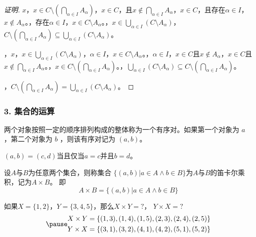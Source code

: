 \documentclass{beamer}
\begin{document}
\begin{CJK*}{UTF8}{gbsn}
\begin{frame}
\begin{proof}[证明]
$x$，$x \in C\setminus (\bigcap_{\alpha \in I}A_{\alpha})$，$x\in C$，且$x \notin \bigcap_{\alpha \in I}A_{\alpha}$，$x\in C$，且存在$\alpha \in I$，$x\notin A_{\alpha}$。，存在$\alpha \in I$，$x\in C\setminus A_{\alpha}$。，$x \in \bigcup_{\alpha \in I}( C\setminus A_{\alpha})$，$C\setminus (\bigcap_{\alpha \in I}A_{\alpha})\subseteq \bigcup_{\alpha\in I}(C\setminus A_{\alpha})$。

，$x$，$x\in \bigcup_{\alpha\in I}(C\setminus A_{\alpha})$，$\alpha \in I$，$x\in C\setminus A_{\alpha}$。，$\alpha \in I$，$x\in C$且$x\notin A_{\alpha}$，$x\in C$且$x\notin \bigcap_{\alpha \in I}A_{\alpha}$。，$x \in C\setminus (\bigcap_{\alpha \in I}A_{\alpha})$。，$\bigcup_{\alpha\in I}(C\setminus A_{\alpha})\subseteq C\setminus (\bigcap_{\alpha \in I}A_{\alpha})$。

，\pause$C\setminus (\bigcap_{\alpha \in I}A_{\alpha})=\bigcup_{\alpha\in I}(C\setminus A_{\alpha})$。
 \end{proof}
\end{frame}
\begin{frame}
  \frametitle{3. 集合的运算}
  \begin{Def}
    两个对象按照一定的顺序排列构成的整体称为一个\alert{有序对}。如果第一个对象为 $a$ ，第二个对象为 $b$ ，则该有序对记为 $(a,b)$。

    $(a,b)=(c,d)$当且仅当$a=c$并且$b=d$。
  \end{Def}\pause
  \begin{Def}
    设$A$与$B$为任意两个集合，则称集合 $\{(a,b)|a\in A \land b \in B\}$为$A$与$B$的\alert{笛卡尔乘积}，记为$A \times B$。
即
\begin{equation*}
  A \times B = \{(a,b)|a \in A \land b \in B\}
\end{equation*}
  \end{Def}\pause
\vspace{-0.5cm}
  \begin{Ex}
    如果$X=\{1,2\}$，$Y=\{3,4,5\}$，那么$X \times Y = ?$， $Y \times X = ?$
    \begin{equation*}
\pause
      \begin{split}
       X \times Y &= \{ (1,3), (1,4), (1,5), (2,3), (2,4), (2, 5) \}\\
       Y \times X &= \{(3,1), (3,2), (4,1), (4,2), (5,1), (5,2)\}
      \end{split}
    \end{equation*}
  \end{Ex}
\end{frame}


\end{CJK*}
\end{document}
